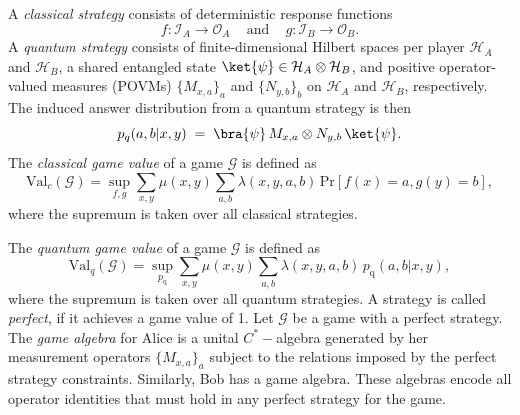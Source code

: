 \documentclass{article}
\begin{document}
    A \textit{classical strategy} consists of deterministic response functions
    \begin{equation}
        f:\mathcal{I}_A\to\mathcal{O}_A \, \quad\text{and}\quad \, g:\mathcal{I}_B\to\mathcal{O}_B.  
    \end{equation}
    A \textit{quantum strategy} consists of finite-dimensional Hilbert spaces per player $\mathcal{H}_A$ and $\mathcal{H}_B$, a shared entangled state $\ket{\psi}\in\mathcal{H}_A\otimes \mathcal{H}_B$, and positive operator-valued measures (POVMs)  $\{M_{x,a}\}_a$ and $\{N_{y,b}\}_b$ on $\mathcal{H}_A$ and $\mathcal{H}_B$, respectively. The induced answer distribution from a quantum strategy is then 
    \begin{equation}
        p_q(a,b|x,y) \;=\; \bra{\psi}\, M_{x,a}\otimes N_{y,b}\,\ket{\psi}.
    \end{equation}
        The \textit{classical game value} of a game $\mathcal{G}$ is defined as
        \begin{equation}
            \mathrm{Val}_c(\mathcal{G}) = \sup_{f,g}   \sum\limits_{x,y}\mu(x,y)\sum\limits_{a,b} \lambda(x,y,a,b)\, \mathrm{Pr}[f(x)=a, g(y)=b],
        \end{equation}
        where the supremum is taken over all classical strategies.

        The \textit{quantum game value} of a game $\mathcal{G}$ is defined as
        \begin{equation}
             \mathrm{Val}_q(\mathcal{G})= \sup_{p_{\mathrm{q}}}  \sum_{x,y}\mu(x,y)\sum_{a,b} \lambda(x,y,a,b)\, p_{\mathrm{q}}(a,b|x,y),
        \end{equation}
        where the supremum is taken over all quantum strategies. 
    A strategy is called \textit{perfect}, if it achieves a game value of 1. 
    Let $\mathcal{G}$ be a game with a perfect strategy. The \textit{game algebra} for Alice is a unital $C^*-$algebra generated by her measurement operators   $\{M_{x,a}\}_a$ subject to the relations imposed by the perfect strategy constraints. Similarly, Bob has a game algebra. These algebras encode all operator identities that must hold in any perfect strategy for the game. 
\end{document}
